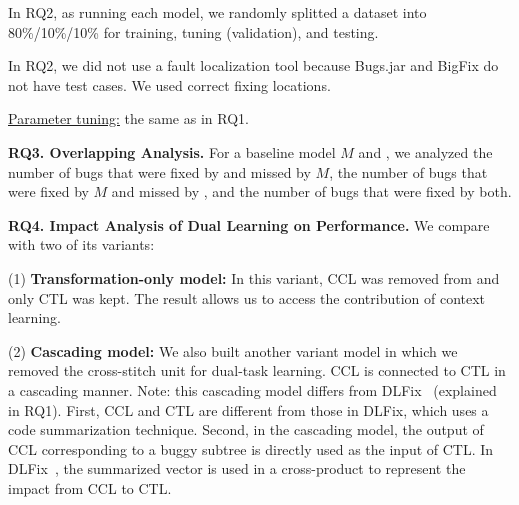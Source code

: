 


In RQ2, as running each model, we randomly splitted a dataset
into 80\%/10\%/10\% for training, tuning (validation), and testing.


In RQ2, we did not use a fault localization tool because Bugs.jar and
BigFix do not have test cases. We used correct fixing locations.

\underline{Parameter tuning:} the same as in RQ1.



{\bf RQ3. Overlapping Analysis.} For a baseline model $M$ and {\tool},
we analyzed the number of bugs that were fixed by {\tool}
and missed by $M$, the number of bugs that were fixed by $M$ and
missed by {\tool}, and the number of bugs that were fixed by
both.


{\bf RQ4. Impact Analysis of Dual Learning on Performance.}
We compare {\tool} with two of its variants:

(1) \textbf{Transformation-only model:} In this variant,
CCL was removed from {\tool} and only CTL was kept. The result
allows us to access the contribution of context learning.


(2) \textbf{Cascading model:} We also built another variant model in
which we removed the cross-stitch unit for dual-task learning. CCL is
connected to CTL in a cascading manner.
Note: this cascading model differs from DLFix~\cite{icse20} (explained
in RQ1). First, CCL and CTL are different from those in DLFix, which
uses a code summarization technique. Second, in the cascading model,
the output of CCL corresponding to a buggy subtree is directly used as
the input of CTL. In DLFix~\cite{icse20}, the summarized vector is
used in a cross-product to represent the impact from CCL to CTL.

